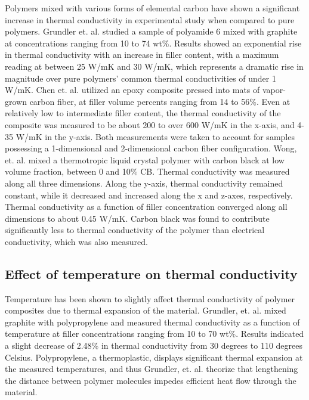 \documentclass[11pt]{article}
\begin{document}
\begin{multicols}{2}
Polymers mixed with various forms of elemental carbon have shown a
significant increase in thermal conductivity in experimental study when
compared to pure polymers. Grundler et. al. studied a sample of
polyamide 6 mixed with graphite at concentrations ranging from 10 to 74
wt\%. Results showed an exponential rise in thermal conductivity with an
increase in filler content, with a maximum reading at between 25 W/mK
and 30 W/mK, which represents a dramatic rise in magnitude over pure
polymers' common thermal conductivities of under 1 W/mK.\cite{Grundler-2016}  Chen
et. al. utilized an epoxy composite pressed into mats of vapor-grown
carbon fiber, at filler volume percents ranging from 14 to 56\%. Even at
relatively low to intermediate filler content, the thermal conductivity
of the composite was measured to be about 200 to over 600 W/mK in the
x-axis, and 4-35 W/mK in the y-axis. Both measurements were taken to
account for samples possessing a 1-dimensional and 2-dimensional carbon
fiber configuration.\cite{Chen-2002-359}  Wong, et. al. mixed a thermotropic liquid
crystal polymer with carbon black at low volume fraction, between 0 and
10\% CB. Thermal conductivity was measured along all three dimensions.
Along the y-axis, thermal conductivity remained constant, while it
decreased and increased along the x and z-axes, respectively. Thermal
conductivity as a function of filler concentration converged along all
dimensions to about 0.45 W/mK. Carbon black was found to contribute
significantly less to thermal conductivity of the polymer than
electrical conductivity, which was also measured.\cite{Wong-2001-1549}

\subsection{Effect of temperature on thermal conductivity}

Temperature has been shown to slightly affect thermal conductivity of
polymer composites due to thermal expansion of the material. Grundler,
et. al. mixed graphite with polypropylene and measured thermal
conductivity as a function of temperature at filler concentrations
ranging from 10 to 70 wt\%. Results indicated a slight decrease of
2.48\% in thermal conductivity from 30 degrees to 110 degrees Celsius.\cite{Grundler-2016}  Polypropylene, a thermoplastic, displays significant thermal
expansion at the measured temperatures, and thus Grundler, et. al.
theorize that lengthening the distance between polymer molecules impedes
efficient heat flow through the material.\cite{Grundler-2016}


\end{multicols}
\end{document}
